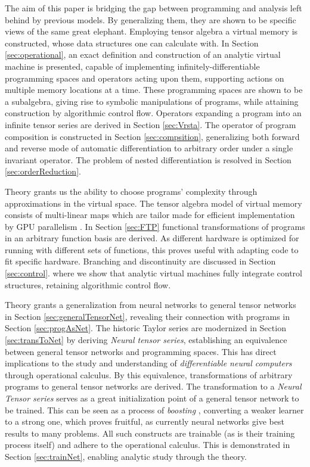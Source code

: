 \documentclass[11pt]{article}
\begin{document}
The aim of this paper is bridging the gap between programming and analysis left
behind by previous models. By generalizing them, they are shown to be specific
views of the same great elephant. Employing tensor algebra a virtual memory is
constructed, whose data structures one can calculate with. In Section \ref{sec:operational}, an exact definition
and construction of an analytic virtual machine is presented, capable of
implementing infinitely-differentiable programming spaces and operators acting
upon them, supporting actions on multiple memory locations at a time. These
programming spaces are shown to be a subalgebra, giving rise to symbolic
manipulations of programs, while attaining construction by algorithmic control
flow. Operators expanding a program into an infinite tensor series are derived
in Section \ref{sec:Vrsta}. The operator of program composition is constructed
in Section \ref{sec:compsition}, generalizing both forward \citep[e.g.,][]{PcAD} and
reverse \citep[e.g.,][]{ReverseAD} mode of automatic differentiation to arbitrary order
under a single invariant operator. The problem of nested differentiation is
resolved in Section \ref{sec:orderReduction}.

Theory grants us the ability to choose programs' complexity through
approximations in the virtual space. The tensor algebra model of virtual memory
consists of multi-linear maps which are tailor made for efficient implementation
by GPU parallelism \citep{TensorGPU}. In Section \ref{sec:FTP} functional
transformations of programs in an arbitrary function basis are derived. As
different hardware is optimized for running with different sets of functions, this
proves useful with adapting code to fit specific hardware. 
Branching and discontinuity are discussed in Section \ref{sec:control}. 
where we show that analytic virtual machines fully integrate control structures,
retaining algorithmic control flow. 
 
Theory grants a generalization from neural networks to general tensor networks in Section \ref{sec:generalTensorNet}, revealing their connection with programs in Section \ref{sec:progAsNet}.
The historic Taylor series are modernized in Section \ref{sec:transToNet} by deriving \emph{Neural tensor series}, establishing an equivalence between general tensor networks and programming spaces. This has direct implications to the study and understanding of \emph{differentiable neural computers} \citep{netRam} through operational calculus. By this equivalence, transformations of arbitrary programs to general tensor networks are derived. The transformation to a \emph{Neural Tensor series} serves as a great initialization point of a general tensor network to be trained. This can be seen as a process of \emph{boosting} \citep{boosting}, converting a weaker learner to a strong one, which proves fruitful, as currently neural networks give best results to many problems.
 All such constructs are trainable (as is their training process itself) and adhere to the operational calculus. This is demonstrated in Section \ref{sec:trainNet}, enabling analytic study through the theory.
\end{document}
